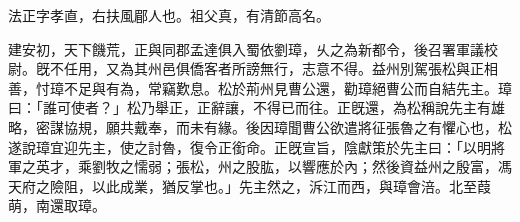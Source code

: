 \begin{pinyinscope}
 
 
 法正字孝直，右扶風郿人也。祖父真，有清節高名。
 
 
 建安初，天下饑荒，正與同郡孟達俱入蜀依劉璋，乆之為新都令，後召署軍議校尉。旣不任用，又為其州邑俱僑客者所謗無行，志意不得。益州別駕張松與正相善，忖璋不足與有為，常竊歎息。松於荊州見曹公還，勸璋絕曹公而自結先主。璋曰：「誰可使者？」松乃舉正，正辭讓，不得已而往。正旣還，為松稱說先主有雄略，密謀協規，願共戴奉，而未有緣。後因璋聞曹公欲遣將征張魯之有懼心也，松遂說璋宜迎先主，使之討魯，復令正銜命。正旣宣旨，陰獻策於先主曰：「以明將軍之英才，乘劉牧之懦弱；張松，州之股肱，以響應於內；然後資益州之殷富，馮天府之險阻，以此成業，猶反掌也。」先主然之，泝江而西，與璋會涪。北至葭萌，南還取璋。
 

\end{pinyinscope}
